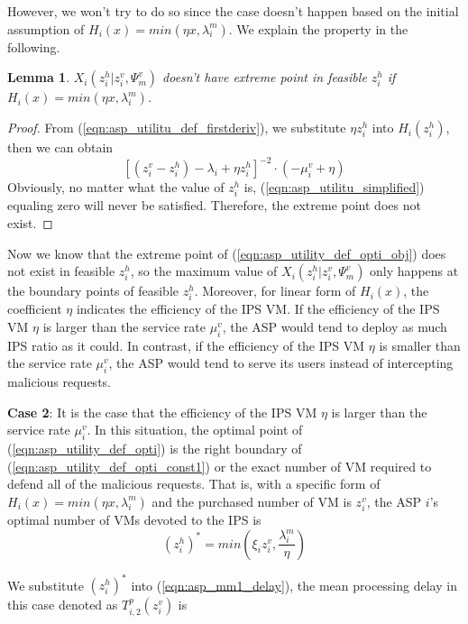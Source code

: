 \documentclass[conference]{IEEEtran}
\newtheorem{lemma}{Lemma}
\begin{document}
However, we won't try to do so since the case doesn't happen based on the initial assumption of $H_i(x) = min(\eta{x}, \lambda_i^m)$. We explain the property in the following.
\begin{lemma} \label{lemma:asp_case1_not_exist}
$X_i(z_i^h|z_i^v,\Psi_m^v)$ doesn't have extreme point in feasible $z_i^h$ if $H_i(x) = min(\eta{x}, \lambda_i^m)$.
\end{lemma}
\begin{proof}
From (\ref{eqn:asp_utilitu_def_firstderiv}),  we substitute $\eta{z_i^h}$ into $H_i(z_i^h)$, then we can obtain
\begin{equation} \label{eqn:asp_utilitu_simplified}
[(z_i^v - z_i^h) - \lambda_i + \eta{z_i^h}]^{-2} \cdot (-\mu_i^v + \eta)
\end{equation}
Obviously, no matter what the value of $z_i^h$ is, (\ref{eqn:asp_utilitu_simplified}) equaling zero will never be satisfied. Therefore, the extreme point does not exist.\qedhere
\end{proof}
Now we know that the extreme point of (\ref{eqn:asp_utility_def_opti_obj}) does not exist in feasible $z_i^h$, so the maximum value of $X_i(z_i^h|z_i^v,\Psi_m^v)$ only happens at the boundary points of feasible $z_i^h$. Moreover, for linear form of $H_i(x)$, the coefficient $\eta$ indicates the efficiency of the IPS VM. If the efficiency of the IPS VM $\eta$ is larger than the service rate $\mu_i^v$, the ASP would tend to deploy as much IPS ratio as it could. In contrast, if the efficiency of the IPS VM $\eta$ is smaller than the service rate $\mu_i^v$, the ASP would tend to serve its users instead of intercepting malicious requests. 

\textbf{Case 2}: It is the case that the efficiency of the IPS VM $\eta$ is larger than the service rate $\mu_i^v$. In this situation, the optimal point of (\ref{eqn:asp_utility_def_opti}) is the right boundary of (\ref{eqn:asp_utility_def_opti_const1}) or the exact number of VM required to defend all of the malicious requests. That is, with a specific form of $H_i(x) = min(\eta x, \lambda_i^m)$ and the purchased number of VM is $z_i^v$, the ASP $i$'s optimal number of VMs devoted to the IPS is
\begin{equation} \label{eqn:asp_utility_def_first_boundary}
(z_i^h)^* = min(\xi_i z_i^v, \frac{\lambda_i^m}{\eta})
\end{equation}

We substitute $(z_i^h)^*$ into (\ref{eqn:asp_mm1_delay}), the mean processing delay in this case denoted as $T_{i,2}^p(z_i^v)$ is
\end{document}
